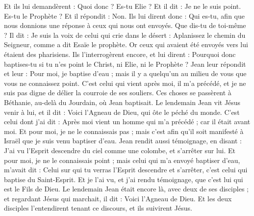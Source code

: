 \begin{multicols}{2}
Et ils lui demandèrent : Quoi donc ? Es-tu Elie ? Et il dit : Je ne le suis point. Es-tu le Prophète ? Et il répondit : Non.
Ils lui dirent donc : Qui es-tu, afin que nous donnions une réponse à ceux qui nous ont envoyés. Que dis-tu de toi-même ?
Il dit : Je suis la voix de celui qui crie dans le désert : Aplanissez le chemin du Seigneur, comme a dit Esaïe le prophète.
Or ceux qui avaient été envoyés vers lui étaient des pharisiens.
Ils l'interrogèrent encore, et lui dirent : Pourquoi donc baptises-tu si tu n'es point le Christ, ni Elie, ni le Prophète ?
Jean leur répondit et leur : Pour moi, je baptise d'eau ; mais il y a quelqu'un au milieu de vous que vous ne connaissez point.
C'est celui qui vient après moi, il m'a précédé, et je ne suis pas digne de délier la courroie de ses souliers.
Ces choses se passèrent à Béthanie, au-delà du Jourdain, où Jean baptisait.
Le lendemain Jean vit Jésus venir à lui, et il dit : Voici l'Agneau de Dieu, qui ôte le péché du monde.
C'est celui dont j'ai dit : Après moi vient un homme qui m'a précédé ; car il était avant moi.
Et pour moi, je ne le connaissais pas ; mais c'est afin qu'il soit manifesté à Israël que je suis venu baptiser d'eau.
Jean rendit aussi témoignage, en disant : J'ai vu l'Esprit descendre du ciel comme une colombe, et s'arrêter sur lui.
Et pour moi, je ne le connaissais point ; mais celui qui m'a envoyé baptiser d'eau, m'avait dit : Celui sur qui tu verras l'Esprit descendre et s'arrêter, c'est celui qui baptise du Saint-Esprit.
Et je l'ai vu, et j'ai rendu témoignage, que c'est lui qui est le Fils de Dieu.
Le lendemain Jean était encore là, avec deux de ses disciples ;
et regardant Jésus qui marchait, il dit : Voici l'Agneau de Dieu.
Et les deux disciples l'entendirent tenant ce discours, et ils suivirent Jésus.

\end{multicols}
